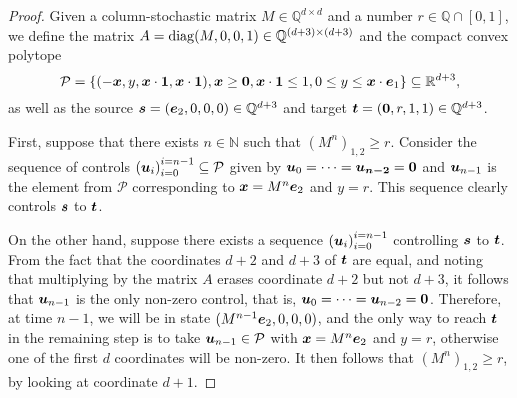 \begin{proof}
Given a column-stochastic matrix $M \in \mathbb{Q}^{d \times d}$ and a number $r \in \mathbb{Q} \cap [0,1]$, we define the matrix $A=\operatorname{diag}(M, 0, 0, 1) \in \mathbb{Q}^{(d+3)\times (d+3)}$ and the compact convex polytope
\begin{equation*}
\mathcal{P} = \lbrace (-\boldsymbol{x}, y, \boldsymbol{x} \cdot \boldsymbol{1}, \boldsymbol{x} \cdot \boldsymbol{1}), \boldsymbol{x} \geq \boldsymbol{0}, \boldsymbol{x} \cdot \boldsymbol{1} \leq 1, 0 \leq y \leq \boldsymbol{x} \cdot \boldsymbol{e}_{1} \rbrace \subseteq \mathbb{R}^{d+3},
\end{equation*}
as well as the source $\boldsymbol{s} = (\boldsymbol{e}_{2}, 0, 0, 0) \in \mathbb{Q}^{d+3}$ and target $\boldsymbol{t} = (\boldsymbol{0}, r, 1, 1) \in \mathbb{Q}^{d+3}$.

First, suppose that there exists $n \in \mathbb{N}$ such that ${\left( M^{n} \right)}_{1,2} \geq r$. Consider the sequence of controls ${\left( \boldsymbol{u}_{i} \right)}_{i=0}^{i=n-1} \subseteq \mathcal{P}$ given by $\boldsymbol{u}_{0} = \cdots = \boldsymbol{u_{n-2}} = \boldsymbol{0}$ and $\boldsymbol{u}_{n-1}$ is the element from $\mathcal{P}$ corresponding to $\boldsymbol{x} = M^{n} \boldsymbol{e}_{2}$ and $y=r$.
This sequence clearly controls $\boldsymbol{s}$ to $\boldsymbol{t}$.

On the other hand, suppose there exists a sequence ${\left( \boldsymbol{u}_{i} \right)}_{i=0}^{i=n-1}$ controlling $\boldsymbol{s}$ to $\boldsymbol{t}$.
From the fact that the coordinates $d+2$ and $d+3$ of $\boldsymbol{t}$ are equal, and noting that multiplying by the matrix $A$ erases coordinate $d+2$ but not $d+3$, it follows that $\boldsymbol{u}_{n-1}$ is the only non-zero control, that is, $\boldsymbol{u}_{0} = \cdots = \boldsymbol{u}_{n-2} = \boldsymbol{0}$.
Therefore, at time $n-1$, we will be in state $(M^{n-1} \boldsymbol{e}_{2}, 0, 0, 0)$, and the only way to reach $\boldsymbol{t}$ in the remaining step is to take $\boldsymbol{u}_{n-1} \in \mathcal{P}$ with $\boldsymbol{x} = M^{n} \boldsymbol{e}_{2}$ and $y=r$, otherwise one of the first $d$ coordinates will be non-zero. It then follows that ${\left( M^{n} \right)}_{1,2} \geq r$, by looking at coordinate $d+1$.
\end{proof}

